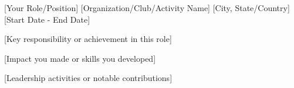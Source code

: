 

\begin{cventries}

%
  \cventry
    {[Your Role/Position]} %
    {[Organization/Club/Activity Name]} %
    {[City, State/Country]} %
    {[Start Date - End Date]} %
    {
      \begin{cvitems} %
        \item {[Key responsibility or achievement in this role]}
        \item {[Impact you made or skills you developed]}
        \item {[Leadership activities or notable contributions]}
      \end{cvitems}
    }


\end{cventries}
